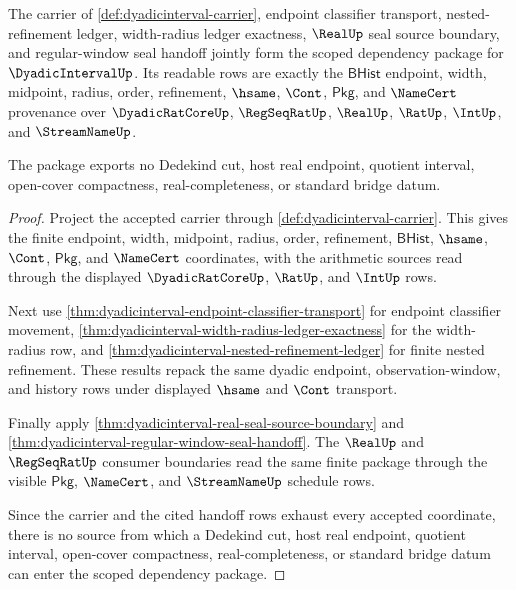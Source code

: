 \begin{theorem}
\label{thm:dyadicinterval-scoped-dependency-package}
The carrier of \autoref{def:dyadicinterval-carrier}, endpoint classifier
transport, nested-refinement ledger, width-radius ledger exactness, $\RealUp$
seal source boundary, and regular-window seal handoff jointly form the scoped
dependency package for $\DyadicIntervalUp$. Its readable rows are exactly the
$\mathsf{BHist}$ endpoint, width, midpoint, radius, order, refinement,
$\hsame$, $\Cont$, $\mathsf{Pkg}$, and $\NameCert$ provenance over
$\DyadicRatCoreUp$, $\RegSeqRatUp$, $\RealUp$, $\RatUp$, $\IntUp$, and
$\StreamNameUp$.

The package exports no Dedekind cut, host real endpoint, quotient interval,
open-cover compactness, real-completeness, or standard bridge datum.
\end{theorem}
\begin{proof}
Project the accepted carrier through \autoref{def:dyadicinterval-carrier}.
This gives the finite endpoint, width, midpoint, radius, order, refinement,
$\mathsf{BHist}$, $\hsame$, $\Cont$, $\mathsf{Pkg}$, and $\NameCert$
coordinates, with the arithmetic sources read through the displayed
$\DyadicRatCoreUp$, $\RatUp$, and $\IntUp$ rows.

Next use \autoref{thm:dyadicinterval-endpoint-classifier-transport} for
endpoint classifier movement, \autoref{thm:dyadicinterval-width-radius-ledger-exactness}
for the width-radius row, and
\autoref{thm:dyadicinterval-nested-refinement-ledger} for finite nested
refinement. These results repack the same dyadic endpoint, observation-window,
and history rows under displayed $\hsame$ and $\Cont$ transport.

Finally apply \autoref{thm:dyadicinterval-real-seal-source-boundary} and
\autoref{thm:dyadicinterval-regular-window-seal-handoff}. The $\RealUp$ and
$\RegSeqRatUp$ consumer boundaries read the same finite package through the
visible $\mathsf{Pkg}$, $\NameCert$, and $\StreamNameUp$ schedule rows.

Since the carrier and the cited handoff rows exhaust every accepted coordinate,
there is no source from which a Dedekind cut, host real endpoint, quotient
interval, open-cover compactness, real-completeness, or standard bridge datum
can enter the scoped dependency package.
\end{proof}

